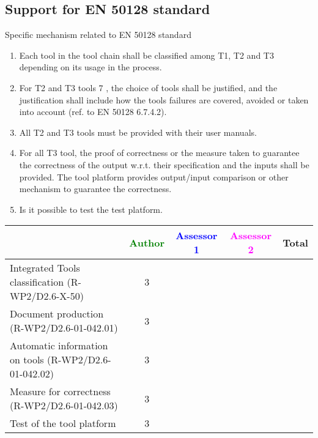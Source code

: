 \subsection{Support for EN 50128 standard}
Specific mechanism related to EN 50128 standard
\begin{enumerate}
\item  Each tool in the tool chain shall be classified among T1, T2
  and T3 depending on its usage in the process.
\item  For T2 and T3 tools 7 , the choice of tools shall be justified,
  and the justification shall include how the tools failures are
  covered, avoided or taken into account (ref. to EN 50128 6.7.4.2).
\item  All T2 and T3 tools must be provided with their user manuals.
\item  For all T3 tool, the proof of correctness or the measure taken
  to guarantee the correctness of the output w.r.t. their
  specification and the inputs shall be provided. The tool platform
  provides output/input comparison  or other mechanism to guarantee
  the correctness.
\item Is it possible to test the test platform.
\end{enumerate}

\begin{tabular}{|l | c | c | c | c|} \hline
  & \textcolor{green}{Author} & \textcolor{blue}{Assessor 1} &  \textcolor{magenta}{Assessor 2} & Total \\
  \hline Integrated Tools classification (R-WP2/D2.6-X-50)  &3
  &                 &                  &\\
  \hline Document production (R-WP2/D2.6-01-042.01) &3
  &                 &                  &\\
  \hline Automatic information on tools (R-WP2/D2.6-01-042.02) &3
  &                 &                  &\\
  \hline Measure for correctness (R-WP2/D2.6-01-042.03) &3
  &                 &                  &\\
  \hline Test of the tool platform &3
  &                 &                  &\\
  \hline
\end{tabular}

